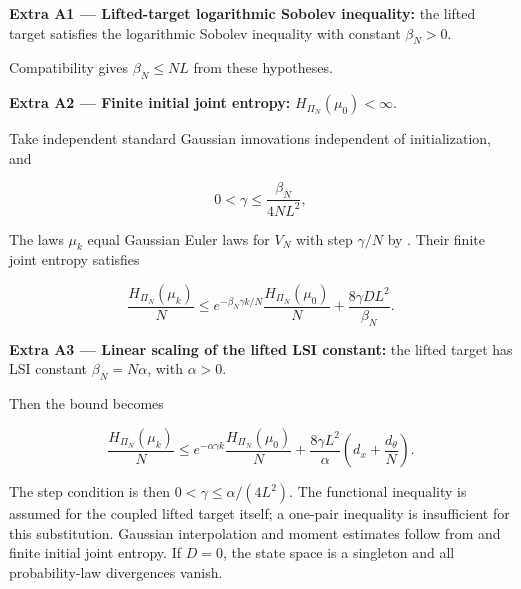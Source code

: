 \documentclass[11pt,a4paper]{report}
\begin{document}
\textbf{Extra A1 — Lifted-target logarithmic Sobolev inequality:} the lifted target satisfies the logarithmic Sobolev inequality with constant \(\beta_N>0\).



Compatibility \cite[Section~3.6.9]{LangevinLean2026ULALSI} gives \(\beta_N\le NL\) from these hypotheses.



\textbf{Extra A2 — Finite initial joint entropy:} \(H_{\Pi_N}(\mu_0)<\infty\).



Take independent standard Gaussian innovations independent of initialization, and

\[0<\gamma\le\frac{\beta_N}{4NL^2},\]

The laws \(\mu_k\) equal Gaussian Euler laws for \(V_N\) with step \(\gamma/N\) by \cite[Section~3.16.3]{LangevinLean2026IPLA}. Their finite joint entropy satisfies

\[\frac{H_{\Pi_N}(\mu_k)}N\le
e^{-\beta_N\gamma k/N}\frac{H_{\Pi_N}(\mu_0)}N
+\frac{8\gamma DL^2}{\beta_N}.\]

\textbf{Extra A3 — Linear scaling of the lifted LSI constant:} the lifted target has LSI constant \(\beta_N=N\alpha\), with \(\alpha>0\).



Then the bound becomes

\[\boxed{\frac{H_{\Pi_N}(\mu_k)}N\le
e^{-\alpha\gamma k}\frac{H_{\Pi_N}(\mu_0)}N
+\frac{8\gamma L^2}{\alpha}\left(d_x+\frac{d_\theta}N\right).}\]

The step condition is then \(0<\gamma\le\alpha/(4L^2)\). The functional inequality is assumed for the coupled lifted target itself; a one-pair inequality is insufficient for this substitution. Gaussian interpolation and moment estimates follow from \cite[Section~3.29.7]{LangevinLean2026ULALSI} and finite initial joint entropy. If \(D=0\), the state space is a singleton and all probability-law divergences vanish.
\end{document}
